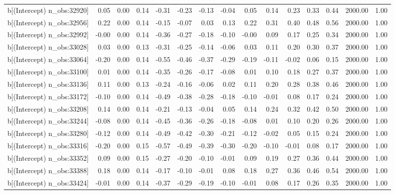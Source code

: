 \begin{table}[ht]
\begin{tabular}{rrrrrrrrrrrrrrr}
  b[(Intercept) n\_obs:32920] & 0.05 & 0.00 & 0.14 & -0.31 & -0.23 & -0.13 & -0.04 & 0.05 & 0.14 & 0.23 & 0.33 & 0.44 & 2000.00 & 1.00 \\ 
  b[(Intercept) n\_obs:32956] & 0.22 & 0.00 & 0.14 & -0.15 & -0.07 & 0.03 & 0.13 & 0.22 & 0.31 & 0.40 & 0.48 & 0.56 & 2000.00 & 1.00 \\ 
  b[(Intercept) n\_obs:32992] & -0.00 & 0.00 & 0.14 & -0.36 & -0.27 & -0.18 & -0.10 & -0.00 & 0.09 & 0.17 & 0.25 & 0.34 & 2000.00 & 1.00 \\ 
  b[(Intercept) n\_obs:33028] & 0.03 & 0.00 & 0.13 & -0.31 & -0.25 & -0.14 & -0.06 & 0.03 & 0.11 & 0.20 & 0.30 & 0.37 & 2000.00 & 1.00 \\ 
  b[(Intercept) n\_obs:33064] & -0.20 & 0.00 & 0.14 & -0.55 & -0.46 & -0.37 & -0.29 & -0.19 & -0.11 & -0.02 & 0.06 & 0.15 & 2000.00 & 1.00 \\ 
  b[(Intercept) n\_obs:33100] & 0.01 & 0.00 & 0.14 & -0.35 & -0.26 & -0.17 & -0.08 & 0.01 & 0.10 & 0.18 & 0.27 & 0.37 & 2000.00 & 1.00 \\ 
  b[(Intercept) n\_obs:33136] & 0.11 & 0.00 & 0.13 & -0.24 & -0.16 & -0.06 & 0.02 & 0.11 & 0.20 & 0.28 & 0.38 & 0.46 & 2000.00 & 1.00 \\ 
  b[(Intercept) n\_obs:33172] & -0.10 & 0.00 & 0.14 & -0.49 & -0.38 & -0.28 & -0.18 & -0.10 & -0.01 & 0.08 & 0.17 & 0.24 & 2000.00 & 1.00 \\ 
  b[(Intercept) n\_obs:33208] & 0.14 & 0.00 & 0.14 & -0.21 & -0.13 & -0.04 & 0.05 & 0.14 & 0.24 & 0.32 & 0.42 & 0.50 & 2000.00 & 1.00 \\ 
  b[(Intercept) n\_obs:33244] & -0.08 & 0.00 & 0.14 & -0.45 & -0.36 & -0.26 & -0.18 & -0.08 & 0.01 & 0.10 & 0.20 & 0.26 & 2000.00 & 1.00 \\ 
  b[(Intercept) n\_obs:33280] & -0.12 & 0.00 & 0.14 & -0.49 & -0.42 & -0.30 & -0.21 & -0.12 & -0.02 & 0.05 & 0.15 & 0.24 & 2000.00 & 1.00 \\ 
  b[(Intercept) n\_obs:33316] & -0.20 & 0.00 & 0.15 & -0.57 & -0.49 & -0.39 & -0.30 & -0.20 & -0.10 & -0.01 & 0.08 & 0.17 & 2000.00 & 1.00 \\ 
  b[(Intercept) n\_obs:33352] & 0.09 & 0.00 & 0.15 & -0.27 & -0.20 & -0.10 & -0.01 & 0.09 & 0.19 & 0.27 & 0.36 & 0.44 & 2000.00 & 1.00 \\ 
  b[(Intercept) n\_obs:33388] & 0.18 & 0.00 & 0.14 & -0.17 & -0.10 & -0.01 & 0.08 & 0.18 & 0.27 & 0.36 & 0.46 & 0.54 & 2000.00 & 1.00 \\ 
  b[(Intercept) n\_obs:33424] & -0.01 & 0.00 & 0.14 & -0.37 & -0.29 & -0.19 & -0.10 & -0.01 & 0.08 & 0.17 & 0.26 & 0.35 & 2000.00 & 1.00 \\ 

\end{tabular}
\end{table}
